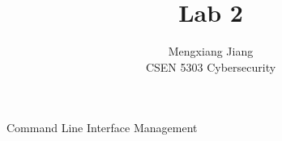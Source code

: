 \documentclass[12pt]{article}
\newenvironment{problem}[2][Problem]{\begin{trivlist}
\item[\hskip \labelsep {\bfseries #1}\hskip \labelsep {\bfseries #2.}]}{\end{trivlist}}
\begin{document}
 
 
\title{Lab 2}%
\author{Mengxiang Jiang\\ %
CSEN 5303 Cybersecurity} %
 
\maketitle
 
\begin{problem}{1} %
Command Line Interface Management


\end{problem}
\end{document}

